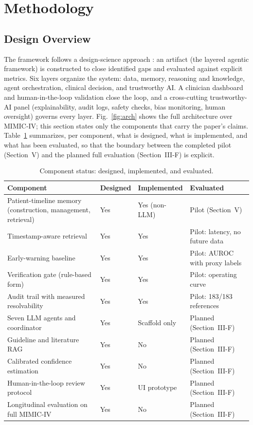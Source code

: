 \section{Methodology}

\subsection{Design Overview}

The framework follows a design-science approach \cite{hevner2004design}: an artifact (the layered
agentic framework) is constructed to close identified gaps and evaluated against explicit
metrics. Six layers organize the system: data, memory, reasoning and knowledge, agent
orchestration, clinical decision, and trustworthy AI. A clinician dashboard and
human-in-the-loop validation close the loop, and a cross-cutting trustworthy-AI panel
(explainability, audit logs, safety checks, bias monitoring, human oversight) governs every
layer. Fig.~\ref{fig:arch} shows the full architecture over MIMIC-IV; this section states only the
components that carry the paper's claims. Table~\ref{tab:1} summarizes, per component, what is
designed, what is implemented, and what has been evaluated, so that the boundary between the
completed pilot (Section~V) and the planned full evaluation (Section~III-F) is explicit.

\begin{table}[!t]
\caption{Component status: designed, implemented, and evaluated.}
\label{tab:1}
\centering\footnotesize
\begin{tabular}{p{}lll}
\hline
\textbf{Component} & \textbf{Designed} & \textbf{Implemented} & \textbf{Evaluated} \\
\hline
Patient-timeline memory (construction, management, retrieval) & Yes & Yes (non-LLM) & Pilot (Section~V) \\
Timestamp-aware retrieval & Yes & Yes & Pilot: latency, no future data \\
Early-warning baseline & Yes & Yes & Pilot: AUROC with proxy labels \\
Verification gate (rule-based form) & Yes & Yes & Pilot: operating curve \\
Audit trail with measured resolvability & Yes & Yes & Pilot: 183/183 references \\
Seven LLM agents and coordinator & Yes & Scaffold only & Planned (Section~III-F) \\
Guideline and literature RAG & Yes & No & Planned (Section~III-F) \\
Calibrated confidence estimation & Yes & No & Planned (Section~III-F) \\
Human-in-the-loop review protocol & Yes & UI prototype & Planned (Section~III-F) \\
Longitudinal evaluation on full MIMIC-IV & Yes & No & Planned (Section~III-F) \\
\hline
\end{tabular}
\end{table}

